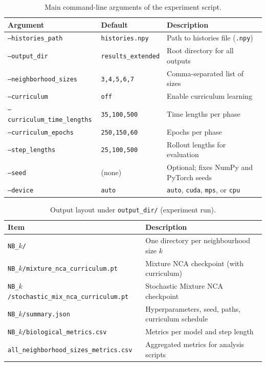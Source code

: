 \begin{table}[htbp]
  \centering
  \caption{Main command-line arguments of the experiment script.}
  \label{tab:tools:expargs}
  \begin{tabular}{@{}lp{4.2cm}p{5.8cm}@{}}
      \hline
      \textbf{Argument} & \textbf{Default} & \textbf{Description} \\
      \hline
      \texttt{--histories\_path} & \texttt{histories.npy} & Path to histories file (\texttt{.npy}) \\
      \texttt{--output\_dir} & \texttt{results\_extended} & Root directory for all outputs \\
      \texttt{--neighborhood\_sizes} & \texttt{3,4,5,6,7} & Comma-separated list of sizes \\
      \texttt{--curriculum} & \texttt{off} & Enable curriculum learning \\
      \texttt{--curriculum\_time\_lengths} & \texttt{35,100,500} & Time lengths per phase \\
      \texttt{--curriculum\_epochs} & \texttt{250,150,60} & Epochs per phase \\
      \texttt{--step\_lengths} & \texttt{25,100,500} & Rollout lengths for evaluation \\
      \texttt{--seed} & (none) & Optional; fixes NumPy and PyTorch seeds \\
      \texttt{--device} & \texttt{auto} & \texttt{auto}, \texttt{cuda}, \texttt{mps}, or \texttt{cpu} \\
      \hline
  \end{tabular}
\end{table}

\begin{table}[htbp]
  \centering
  \caption{Output layout under \texttt{output\_dir/} (experiment run).}
  \label{tab:tools:outputs}
  \begin{tabular}{@{}lp{7.2cm}@{}}
    \hline
    \textbf{Item} & \textbf{Description} \\
    \hline
    \texttt{NB\_$k$/} & One directory per neighbourhood size $k$ \\
    \texttt{NB\_$k$/mixture\_nca\_curriculum.pt} & Mixture NCA checkpoint (with curriculum) \\
    \texttt{NB\_$k$/stochastic\_mix\_nca\_curriculum.pt} & Stochastic Mixture NCA checkpoint \\
    \texttt{NB\_$k$/summary.json} & Hyperparameters, seed, paths, curriculum schedule \\
    \texttt{NB\_$k$/biological\_metrics.csv} & Metrics per model and step length \\
    \texttt{all\_neighborhood\_sizes\_metrics.csv} & Aggregated metrics for analysis scripts \\
    \hline
  \end{tabular}
\end{table}

